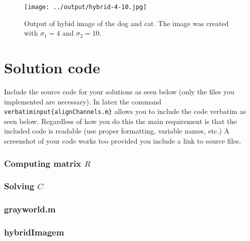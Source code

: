 \documentclass[10pt,letterpaper]{article}
\newcommand{\cmd}[1] {{\color{blue}\texttt{#1}}}
\begin{document}
\begin{figure}[h]
\texttt{[image: ../output/hybrid-4-10.jpg]}
\caption{Output of hybid image of the dog and cat. The image was created with $\sigma_1 = 4$ and $\sigma_2 = 10$.}
\end{figure}


\newpage

\section{Solution code}
Include the source code for your solutions as seen below (only the files you implemented are necessary). 
In latex the command \cmd{verbatiminput\{alignChannels.m\}} allows you to include the code verbatim as seen below. 
Regardless of how you do this the main requirement is that the included code is readable (use proper formatting, variable names, etc.)
A screenshot of your code works too provided you include a link to source files.



\subsubsection{Computing matrix $R$}

\subsubsection{Solving $C$}

\subsubsection{grayworld.m}

\subsubsection{hybridImagem}

\end{document}
